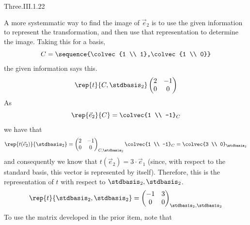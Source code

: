 \begin{ans}{Three.III.1.22}
\begin{exparts}
          A more systemmatic way to find the image of $\vec{e}_2$ is to
          use the given information to represent the transformation, and then
          use that representation to determine the image.
          Taking this for a basis,
          \begin{equation*}
            C=\sequence{\colvec{1 \\ 1},\colvec{1 \\ 0}}
          \end{equation*}
          the given information says this.
          \begin{equation*}
            \rep{t}{C,\stdbasis_2}
            \begin{pmatrix}
              2  &-1  \\
              0  &0
            \end{pmatrix}
          \end{equation*}
          As
          \begin{equation*}
            \rep{\vec{e}_2}{C}=\colvec{1 \\ -1}_C
          \end{equation*}
          we have that
          \begin{equation*}
            \rep{t(\vec{e}_2)}{\stdbasis_2}
            =\begin{pmatrix}
               2  &-1  \\
               0  &0
             \end{pmatrix}_{C,\stdbasis_2}
            \colvec{1 \\ -1}_C
            =\colvec{3 \\ 0}_{\stdbasis_2}
          \end{equation*}
          and consequently we know that $t(\vec{e}_2)=3\cdot\vec{e}_1$
          (since, with respect to the standard basis, this vector is
          represented by itself).
          Therefore, this is the representation of $t$ with respect to
          $\stdbasis_2,\stdbasis_2$.
          \begin{equation*}
            \rep{t}{\stdbasis_2,\stdbasis_2}
            =\begin{pmatrix}
               -1 &3   \\
               0  &0
             \end{pmatrix}_{\stdbasis_2,\stdbasis_2}
          \end{equation*}
        \partsitem To use the matrix developed in the prior item, note that
          \begin{equation*}

\end{equation*}
\end{exparts}
\end{ans}
